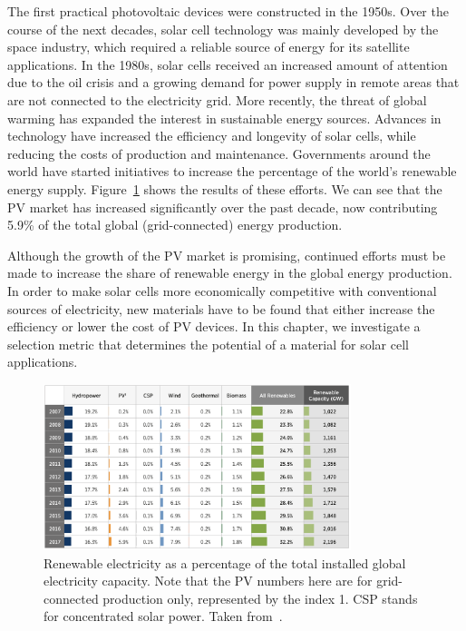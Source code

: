 \begin{refsection}
The first practical photovoltaic devices were constructed in the 1950s. Over 
the course of the next decades, solar cell technology was mainly developed by 
the space industry, which required a reliable source of energy for its 
satellite applications. In the 1980s, solar cells received an increased amount 
of attention due to the oil crisis and a growing demand for power supply in 
remote areas that are not connected to the electricity grid. More recently, 
the threat of global warming has expanded the interest in sustainable energy 
sources. Advances in technology have increased the efficiency and longevity of 
solar cells, while reducing the costs of production and maintenance. 
Governments around the world have started initiatives to increase the 
percentage of the world's renewable energy supply. 
Figure~\ref{fig:slme-pv_evo} shows the results of these efforts. We can see 
that the PV market has increased significantly over the past decade, now 
contributing 5.9\% of the total global (grid-connected) energy production. 
 
Although the growth of the PV market is promising, continued efforts must be 
made to increase the share of renewable energy in the global energy 
production. In order to make solar cells more economically competitive with 
conventional sources of electricity, new materials have to be found that 
either increase the efficiency or lower the cost of PV devices. In this 
chapter, we investigate a selection metric that determines the potential of a 
material for solar cell applications. 
 
\begin{figure}[!htp]  
\centering 
\includegraphics[width=0.8\textwidth]{./Figures/slme/pv-evo.png} 
\caption{Renewable electricity as a percentage of the total installed global 
electricity capacity. Note that the PV numbers here are for grid-connected production only, represented by the index 1. CSP stands for concentrated solar power. Taken from~\cite{NREL2017}.} 
\label{fig:slme-pv_evo}  
\end{figure} 
 

\end{refsection}
